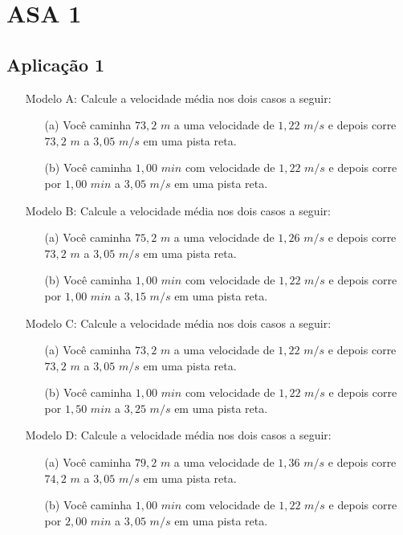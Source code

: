 \chapter{ASA 1} \label{apendice:asa1}
\section{Aplicação 1} \label{ch:ASA1a1}
\begin{itemize}
    \item[Modelo A:] Calcule a velocidade média nos dois casos a seguir:
    \begin{itemize}
        \item[(a)] Você caminha $73,2$ $m$ a uma velocidade de $1,22$ $m/s$ e depois corre $73,2$ $m$ a $3,05$ $m/s$ em uma pista reta.
        \item[(b)] Você caminha $1,00$ $min$ com velocidade de $1,22$ $m/s$ e depois corre por $1,00$ $min$ a $3,05$ $m/s$ em uma pista reta.
    \end{itemize}
    \item[Modelo B:] Calcule a velocidade média nos dois casos a seguir:
    \begin{itemize}
        \item[(a)] Você caminha $75,2$ $m$ a uma velocidade de $1,26$ $m/s$ e depois corre $73,2$ $m$ a $3,05$ $m/s$ em uma pista reta.
        \item[(b)] Você caminha $1,00$ $min$ com velocidade de $1,22$ $m/s$ e depois corre por $1,00$ $min$ a $3,15$ $m/s$ em uma pista reta.
    \end{itemize}
    \item[Modelo C:] Calcule a velocidade média nos dois casos a seguir:
    \begin{itemize}
        \item[(a)] Você caminha $73,2$ $m$ a uma velocidade de $1,22$ $m/s$ e depois corre $73,2$ $m$ a $3,05$ $m/s$ em uma pista reta.
        \item[(b)] Você caminha $1,00$ $min$ com velocidade de $1,22$ $m/s$ e depois corre por $1,50$ $min$ a $3,25$ $m/s$ em uma pista reta.
    \end{itemize}
    \item[Modelo D:] Calcule a velocidade média nos dois casos a seguir:
    \begin{itemize}
        \item[(a)] Você caminha $79,2$ $m$ a uma velocidade de $1,36$ $m/s$ e depois corre $74,2$ $m$ a $3,05$ $m/s$ em uma pista reta.
        \item[(b)] Você caminha $1,00$ $min$ com velocidade de $1,22$ $m/s$ e depois corre por $2,00$ $min$ a $3,05$ $m/s$ em uma pista reta.
    \end{itemize}
\end{itemize}
\newpage

